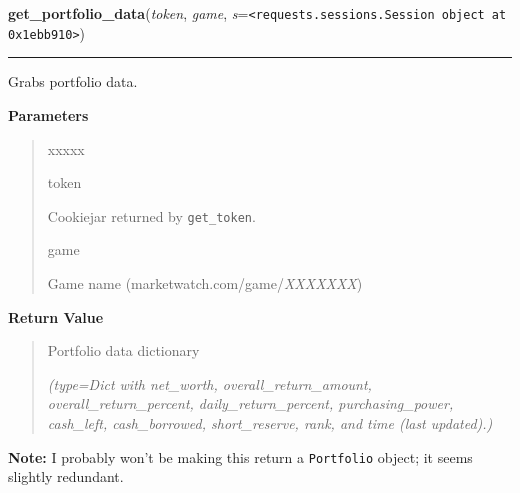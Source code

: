     \label{moira:get_portfolio_data}

    \vspace{0.5ex}

\hspace{.8\funcindent}\begin{boxedminipage}{\funcwidth}

    \raggedright \textbf{get\_portfolio\_data}(\textit{token}, \textit{game}, \textit{s}={\tt {\textless}requests.sessions.Session object at 0x1ebb910{\textgreater}})

    \vspace{-1.5ex}

    \rule{\textwidth}{0.5\fboxrule}
\setlength{\parskip}{2ex}
    Grabs portfolio data.

\setlength{\parskip}{1ex}
      \textbf{Parameters}
      \vspace{-1ex}

      \begin{quote}
        \begin{Ventry}{xxxxx}

          \item[token]

          Cookiejar returned by \texttt{get\_token}.

          \item[game]

          Game name (marketwatch.com/game/\textit{XXXXXXX})

        \end{Ventry}

      \end{quote}

      \textbf{Return Value}
    \vspace{-1ex}

      \begin{quote}
      Portfolio data dictionary

      {\it (type=Dict with net\_worth, overall\_return\_amount, 
      overall\_return\_percent, daily\_return\_percent, purchasing\_power, 
      cash\_left, cash\_borrowed, short\_reserve, rank, and time (last 
      updated).)}

      \end{quote}

\textbf{Note:} I probably won't be making this return a \texttt{Portfolio} object; it 
seems slightly redundant.



    \end{boxedminipage}

